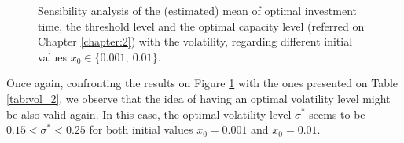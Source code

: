 \begin{figure}[!ht]
	\begin{subfigmatrix}{3}
	\end{subfigmatrix}
	\caption{Sensibility analysis of the (estimated) mean of optimal investment time, the threshold level and the optimal capacity level (referred on Chapter \ref{chapter:2}) with the volatility, regarding different initial values $x_0 \in \{0.001, \ 0.01\}$.}
	\label{fig:vol_2}
\end{figure}

Once again, confronting the results on Figure \ref{fig:vol_2} with the ones presented on Table \ref{tab:vol_2}, we observe that the idea of having an optimal volatility level might be also valid again.  In this case, the optimal volatility level $\sigma^*$ seems to be $0.15 < \sigma^* < 0.25$ for both initial values $x_0=0.001$ and $x_0=0.01$.


